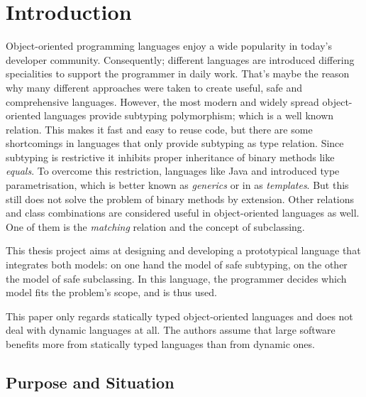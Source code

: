 \chapter{Introduction}
Object-oriented programming languages enjoy a wide popularity in today's
developer community. Consequently; different languages are introduced differing
specialities to support the programmer in daily work. That's maybe
the reason why many different approaches were taken to create useful, safe
and comprehensive languages. However, the most modern and widely spread
object-oriented languages provide subtyping polymorphism; which is a well
known relation. This makes
it fast and easy to reuse code, but there are some shortcomings in languages
that only provide subtyping as type relation. Since subtyping
is restrictive it inhibits proper inheritance of binary methods like
\emph{equals}. To overcome this restriction, languages like Java and \cs
introduced type parametrisation, which is better known as \emph{generics}
or in \cpp as \emph{templates}. But this still does not solve the problem
of binary methods by extension. Other relations and class combinations
are considered useful in object-oriented languages as well. One of them
is the \emph{matching} relation and the concept of subclassing.

This thesis project aims at designing and developing a prototypical
language that integrates both models: on one hand the model  of safe
subtyping, on the other the  model of safe subclassing. In this language,
the programmer decides which model fits the problem's scope, and is
thus used.

This paper only regards statically typed object-oriented languages and does
not deal with dynamic languages at all. The authors assume that large
software benefits more from statically typed languages than from dynamic
ones.

\section{Purpose and Situation}
